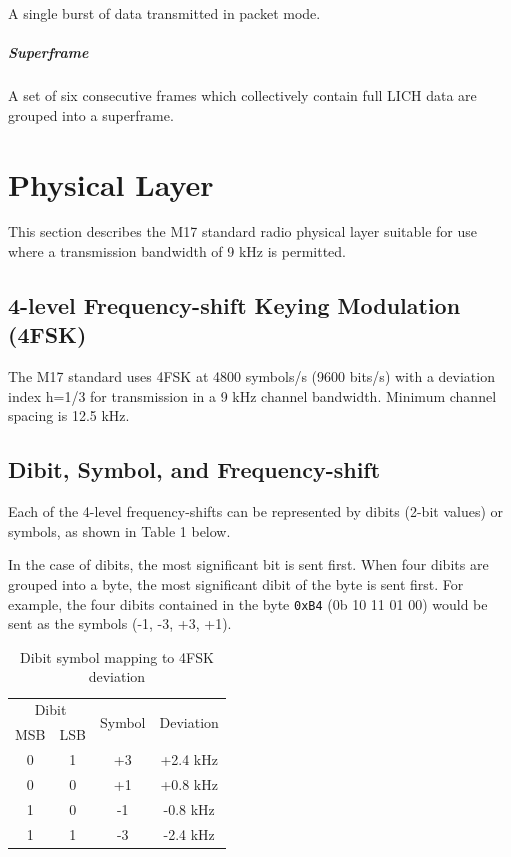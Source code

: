 \documentclass[a4paper,11pt,oneside]{book}
\makeatletter
\renewcommand{\mainmatter}{\cleardoublepage\@mainmattertrue}
\makeatother
\begin{document}
A single burst of data transmitted in packet mode.

\paragraph{Superframe}

A set of six consecutive frames which collectively contain full LICH
data are grouped into a superframe.

\mainmatter
\chapter{Physical Layer}

This section describes the M17 standard radio physical layer suitable
for use where a transmission bandwidth of 9 kHz is permitted.

\section{4-level Frequency-shift Keying Modulation (4FSK)}

The M17 standard uses 4FSK at 4800 symbols/s (9600 bits/s) with a deviation index h=1/3 for transmission in a 9 kHz channel bandwidth. Minimum channel spacing is 12.5 kHz.

\section{Dibit, Symbol, and Frequency-shift}

Each of the 4-level frequency-shifts can be represented by dibits (2-bit values) or symbols, as shown in Table 1 below.

In the case of dibits, the most significant bit is sent first. When four dibits are grouped into a byte, the most significant dibit of the byte
is sent first. For example, the four dibits contained in the byte \texttt{0xB4} (0b 10 11 01 00) would be sent as the symbols (-1, -3, +3, +1).

\begin{table}[H]
	\centering
	\begin{tabular}{|c|c|c|c|}
		\hline
		\multicolumn{2}{|c|}{Dibit} & \multirow{2}{*}{Symbol} & \multirow{2}{*}{Deviation} \\
		MSB & LSB &  &  \\
		\hline
		0 & 1 & +3 & +2.4 kHz \\
		0 & 0 & +1 & +0.8 kHz \\
		1 & 0 & -1 & -0.8 kHz \\
		1 & 1 & -3 & -2.4 kHz \\
		\hline
	\end{tabular}
	\caption{Dibit symbol mapping to 4FSK deviation}
\end{table}
\end{document}
